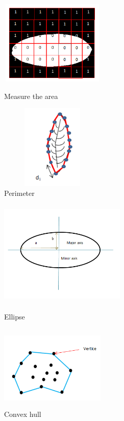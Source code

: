 \documentclass{article}
\begin{document}
\begin{figure}[!ht]
\begin{subfigure}{.5\textwidth}

\centering
        \includegraphics[width=50mm, height=40mm]{./Figures/Areacal.png}
        \caption{\label{areacal}Measure the area}
        
\centering
        \includegraphics[width=50mm, height=40mm]{./Figures/perical.png}
        \caption{\label{calperi}Perimeter}
        
        
\end{subfigure} 
\begin{subfigure}{.5\textwidth}
\centering
        \includegraphics[width=60mm, height=50mm]{./Figures/c11.png}
        \caption{\label{shape6}Ellipse}
        
\centering
        \includegraphics[width=50mm, height=40mm]{./Figures/concal.png}
        \caption{\label{shconvex}Convex hull}       
        
\end{subfigure} 

\caption{}
        \end{figure}
\end{document}
